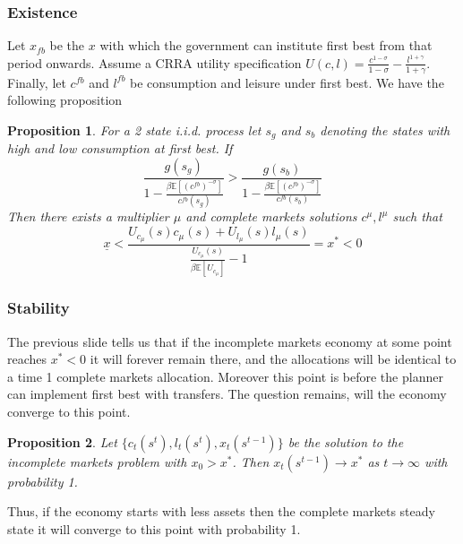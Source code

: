 \documentclass{beamer}
\newcommand{\EE}{\mathbb E}
\newtheorem{proposition}{Proposition}
\begin{document}
\begin{frame}
	\frametitle{Existence}
	Let $x_{fb}$ be the $x$ with which the government can institute first best from that period onwards.  Assume a CRRA utility specification $U(c,l) = \frac{c^{1-\sigma}}{1-\sigma} -\frac{ l^{1+\gamma}}{1+\gamma}$.  Finally, let  $c^{fb}$ and $l^{fb}$ be consumption and leisure under first best.  We have the following proposition
	\begin{proposition}  For a 2 state i.i.d. process let  $s_g$ and $s_b$ denoting the states with high and low consumption at first best.  If
	\[
		\frac{g(s_g)}{1-\frac{\beta\EE[(c^{fb})^{-\sigma}]}{c^{fb}(s_g)}} > \frac{g(s_b)}{1-\frac{\beta\EE[(c^{fb})^{-\sigma}]}{c^{fb}(s_b)}}
	\]  Then there exists a multiplier $\mu$ and complete markets solutions $c^\mu,l^\mu$ such that 
	\[
	\underline x<\frac{U_{c_\mu}(s)c_\mu(s) + U_{l_\mu}(s) l_\mu(s)}{\frac{U_{c_\mu}(s)}{\beta\EE[U_{c_\mu}]}-1} = x^* <0
	\]
	\end{proposition} 
\end{frame}


\begin{frame}
	\frametitle{Stability}
	The previous slide tells us that if the incomplete markets economy at some point reaches  $x^* < 0$ it will forever remain there, and the allocations will be identical to a time 1 complete markets allocation.  Moreover this point is before the planner can implement first best with transfers.  The question remains, will the economy converge to this point.
	\begin{proposition}  Let $\{c_t(s^t), l_t(s^t), x_t(s^{t-1})\}$ be the solution to the incomplete markets problem with $x_0 > x^*$.  Then  $x_t(s^{t-1})\rightarrow x^*$ as $t\rightarrow \infty$ with probability 1.
	\end{proposition}  Thus, if the economy starts with less assets then the complete markets steady state it will converge to this point with probability 1.
\end{frame}
\end{document}
